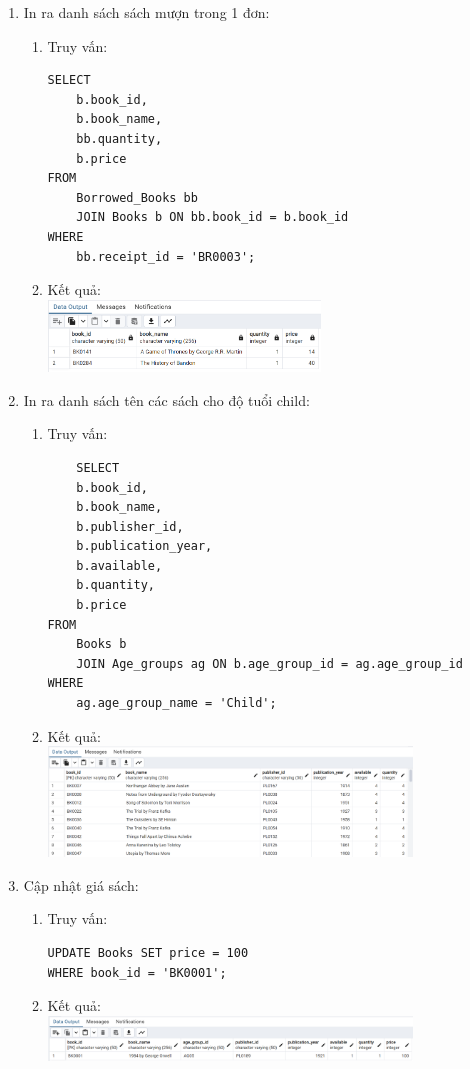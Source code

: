 \documentclass[12pt]{article}
\begin{document}
\begin{enumerate}
 \item In ra danh sách sách mượn trong 1 đơn:
    \begin{enumerate}
        \item Truy vấn:
        \begin{lstlisting}
SELECT
    b.book_id,
    b.book_name,
    bb.quantity,
    b.price
FROM
    Borrowed_Books bb
    JOIN Books b ON bb.book_id = b.book_id
WHERE
    bb.receipt_id = 'BR0003'; 
        \end{lstlisting}
        \item Kết quả:\\
        \includegraphics[width= 0.6\textwidth]{query2.png}
    \end{enumerate}   

 \item In ra danh sách tên các sách cho độ tuổi child:
    \begin{enumerate}
        \item Truy vấn:
        \begin{lstlisting}
    SELECT
    b.book_id,
    b.book_name,
    b.publisher_id,
    b.publication_year,
    b.available,
    b.quantity,
    b.price
FROM
    Books b
    JOIN Age_groups ag ON b.age_group_id = ag.age_group_id
WHERE
    ag.age_group_name = 'Child';
        \end{lstlisting}
        \item Kết quả:\\
        \includegraphics[width= 0.8\textwidth]{query3.png}
    \end{enumerate} 

    \item Cập nhật giá sách:
    \begin{enumerate}
        \item Truy vấn:
        \begin{lstlisting}
UPDATE Books SET price = 100
WHERE book_id = 'BK0001';
        \end{lstlisting}
        \item Kết quả:\\
        \includegraphics[width= 0.8\textwidth]{query4.png}
    \end{enumerate}



\end{enumerate}
\end{document}
